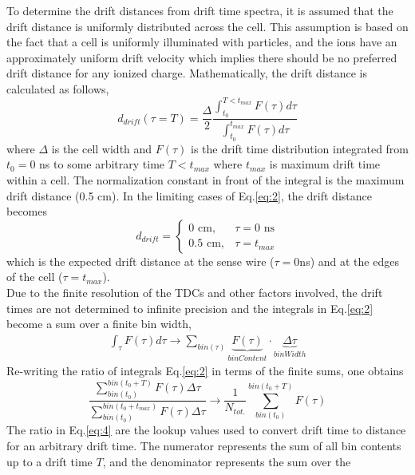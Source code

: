 \documentclass[journal, a4paper]{IEEEtran}
\begin{document}
\indent To determine the drift distances from drift time spectra, it is assumed that the
drift distance is uniformly distributed across the cell. This assumption is based on the fact that
a cell is uniformly illuminated with particles, and the ions have an approximately uniform drift velocity
which implies there should be no preferred drift distance for any ionized charge.
Mathematically, the drift distance is calculated as follows,
\begin{equation}\label{eq:2}
d_{drift}(\tau = T) = \frac{\Delta}{2} \frac{\int_{t_{0}}^{T<t_{max}}F(\tau)d\tau}{\int_{t_{0}}^{t_{max}}F(\tau)d\tau}
\end{equation}
where $\Delta$ is the cell width and $F(\tau)$ is the drift time distribution integrated from $t_{0} = 0$ ns to some arbitrary time $T<t_{max}$
where $t_{max}$ is maximum drift time within a cell. The normalization constant in front of the integral is the maximum
drift distance (0.5 cm). In the limiting cases of Eq.\ref{eq:2}, the drift distance becomes
\begin{equation}
  d_{drift} =\begin{cases}
               0 \text{ cm}, & \tau = 0 \text{ ns} \\
               0.5 \text{ cm}, & \tau = t_{max}
            \end{cases}
\end{equation}
which is the expected drift distance at the sense wire ($\tau=0 $ns) and at the edges of the cell ($\tau = t_{max}$). \\
\indent Due to the finite resolution of the TDCs and other factors involved, the drift times are not determined to infinite precision and
the integrals in Eq.\ref{eq:2} become a sum over a finite bin width,
\begin{align*}
\int_{\tau}F(\tau)d\tau \longrightarrow \sum_{bin(\tau)} \underbrace{F(\tau)}_{binContent}\cdot\underbrace{\Delta\tau}_{binWidth}
\end{align*}
Re-writing the ratio of integrals Eq.\ref{eq:2} in terms of the finite sums, one obtains
\begin{equation}\label{eq:4}
\frac{\sum\limits_{bin(t_{0})}^{bin(t_{0}+T)}F(\tau)\Delta\tau}{\sum\limits_{bin(t_{0})}^{bin(t_{0}+t_{max})}F(\tau)\Delta\tau} \rightarrow \boxed{\frac{1}{N_{tot.}}\sum\limits_{bin(t_{0})}^{bin(t_{0}+T)}F(\tau)}
\end{equation}
The ratio in Eq.\ref{eq:4} are the lookup values used to convert drift time to distance for an arbitrary drift time. The
numerator represents the sum of all bin contents up to a drift time $T$, and the denominator represents the sum over the
\end{document}
